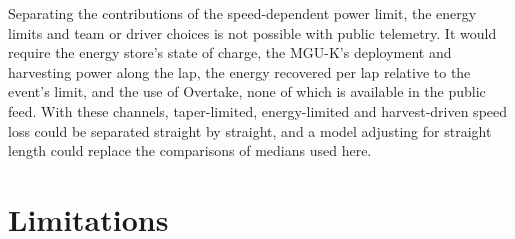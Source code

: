 \documentclass[11pt,a4paper]{article}
\begin{document}
Separating the contributions of the speed-dependent power limit, the energy limits and team or driver choices is not possible with public telemetry. It would require the energy store's state of charge, the MGU-K's deployment and harvesting power along the lap, the energy recovered per lap relative to the event's limit, and the use of Overtake, none of which is available in the public feed. With these channels, taper-limited, energy-limited and harvest-driven speed loss could be separated straight by straight, and a model adjusting for straight length could replace the comparisons of medians used here.

\section{Limitations}
\label{sec:limits}
\end{document}
